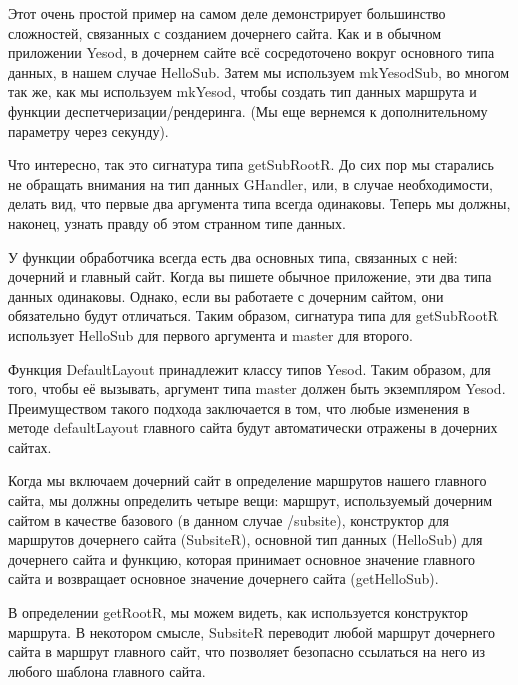 Этот очень простой пример на самом деле демонстрирует большинство сложностей, связанных с созданием дочернего сайта. Как и в обычном приложении Yesod, в дочернем сайте всё сосредоточено вокруг основного типа данных, в нашем случае HelloSub. Затем мы используем mkYesodSub, во многом так же, как мы используем mkYesod, чтобы создать тип данных маршрута и функции деспетчеризации/рендеринга. (Мы еще вернемся к дополнительному параметру через секунду).

Что интересно, так это сигнатура типа getSubRootR. До сих пор мы старались не обращать внимания на тип данных GHandler, или, в случае необходимости, делать вид, что первые два аргумента типа всегда одинаковы. Теперь мы должны, наконец, узнать правду об этом странном типе данных.

У функции обработчика всегда есть два основных типа, связанных с ней: дочерний и главный сайт. Когда вы пишете обычное приложение, эти два типа данных одинаковы. Однако, если вы работаете с дочерним сайтом, они обязательно будут отличаться. Таким образом, сигнатура типа для getSubRootR использует HelloSub для первого аргумента и master для второго.

Функция DefaultLayout принадлежит классу типов Yesod. Таким образом, для того, чтобы её вызывать, аргумент типа master должен быть экземпляром Yesod. Преимуществом такого подхода заключается в том, что любые изменения в методе defaultLayout главного сайта будут автоматически отражены в дочерних сайтах.

Когда мы включаем дочерний сайт в определение маршрутов нашего главного сайта, мы должны определить четыре вещи: маршрут, используемый дочерним сайтом в качестве базового (в данном случае /subsite), конструктор для маршрутов дочернего сайта (SubsiteR), основной тип данных (HelloSub) для дочернего сайта и функцию, которая принимает основное значение главного сайта и возвращает основное значение дочернего сайта (getHelloSub).

В определении getRootR, мы можем видеть, как используется конструктор маршрута. В некотором смысле, SubsiteR переводит любой маршрут дочернего сайта в маршрут главного сайт, что позволяет безопасно ссылаться на него из любого шаблона главного сайта.
